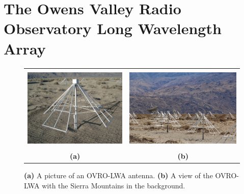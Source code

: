\chapter{The Owens Valley Radio Observatory Long Wavelength Array}

\begin{figure}
    \centering
    \begin{tabular}{cc}
        \includegraphics[height=4cm]{figures/chapter2/lwa-antenna} &
        \includegraphics[height=4cm]{figures/chapter2/ovro-lwa} \\
        \textbf{(a)} & \textbf{(b)} \\
    \end{tabular}
    \caption{
        \textbf{(a)} A picture of an OVRO-LWA antenna.
        \textbf{(b)} A view of the OVRO-LWA with the Sierra Mountains in the background.
    }
    \label{fig:ovro-lwa-pictures}
\end{figure}


